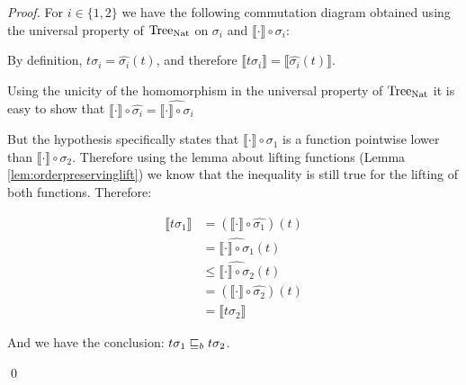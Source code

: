 \begin{proof}
    For $i \in \{ 1, 2\}$ we have the following commutation diagram 
    obtained using the universal property of $\textnormal{Tree}_{\textnormal{Nat}}$ on 
    $\sigma_i$ and $\llbracket \cdot \rrbracket \circ \sigma_i$:

    \begin{center}
    \end{center}

    By definition, $t \sigma_i = \hat{\sigma_i} (t)$, 
    and therefore $\llbracket t \sigma_i \rrbracket = \llbracket \hat{\sigma_i}
    (t) \rrbracket$.

    Using the unicity of the homomorphism in the universal property of
    $\textnormal{Tree}_{\textnormal{Nat}}$ it is easy to show that $\llbracket \cdot \rrbracket 
    \circ \hat{\sigma_i} = \widehat{ \llbracket \cdot \rrbracket \circ \sigma_i
    }$

    But the hypothesis specifically states that $\llbracket \cdot \rrbracket 
    \circ \sigma_1$ is a function pointwise lower than $\llbracket \cdot
    \rrbracket \circ \sigma_2$. Therefore using the lemma about 
    lifting functions (Lemma \ref{lem:orderpreservinglift})
    we know that the inequality is still true for the lifting 
    of both functions. Therefore:

    \begin{align*}
        \llbracket t \sigma_1 \rrbracket &= 
        (\llbracket \cdot \rrbracket \circ \hat{\sigma_1}) (t) \\
        &= \widehat{ \llbracket \cdot \rrbracket \circ \sigma_1} (t) \\
        &\leq \widehat{ \llbracket \cdot \rrbracket \circ \sigma_2} (t) \\
        &= 
        (\llbracket \cdot \rrbracket \circ \hat{\sigma_2}) (t) \\
        &= \llbracket t \sigma_2 \rrbracket
    \end{align*}
    
    And we have the conclusion: $t \sigma_1 \sqsubseteq_b t \sigma_2$.

\qed\end{proof}


